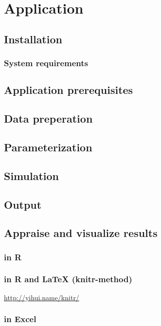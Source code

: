 \section{Application }


\subsection{Installation}


\subsubsection{System requirements}


\subsection{Application prerequisites}


\subsection{Data preperation}


\subsection{Parameterization}


\subsection{Simulation}


\subsection{Output}


\subsection{Appraise and visualize results}


\subsubsection{in R }


\subsubsection{in R and \protect\LaTeX{} (knitr-method)}

\url{http://yihui.name/knitr/}

\subsubsection{in Excel}